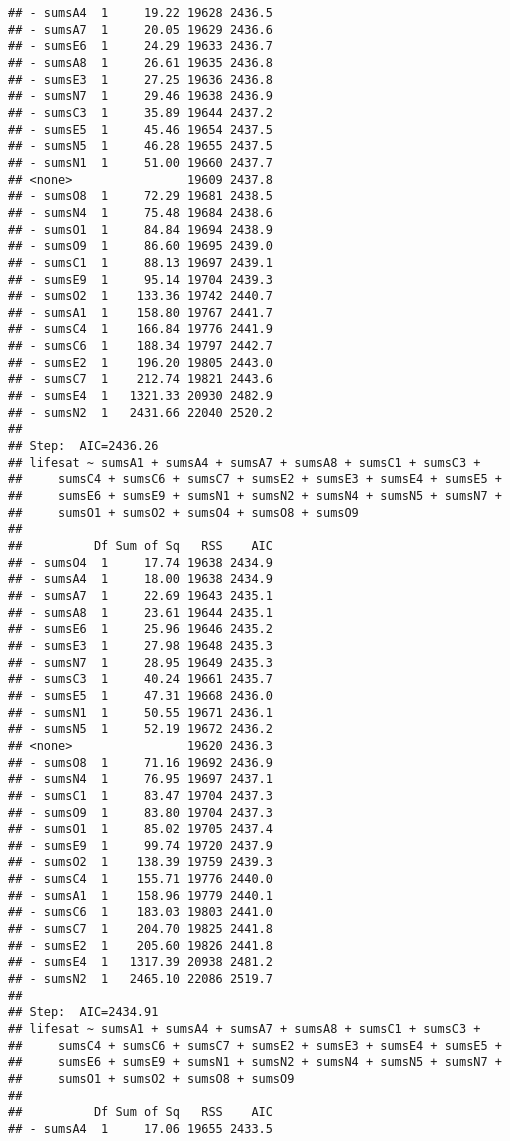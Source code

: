 \documentclass[,man,floatsintext]{apa6}
\begin{document}
\begin{verbatim}
## - sumsA4  1     19.22 19628 2436.5
## - sumsA7  1     20.05 19629 2436.6
## - sumsE6  1     24.29 19633 2436.7
## - sumsA8  1     26.61 19635 2436.8
## - sumsE3  1     27.25 19636 2436.8
## - sumsN7  1     29.46 19638 2436.9
## - sumsC3  1     35.89 19644 2437.2
## - sumsE5  1     45.46 19654 2437.5
## - sumsN5  1     46.28 19655 2437.5
## - sumsN1  1     51.00 19660 2437.7
## <none>                19609 2437.8
## - sumsO8  1     72.29 19681 2438.5
## - sumsN4  1     75.48 19684 2438.6
## - sumsO1  1     84.84 19694 2438.9
## - sumsO9  1     86.60 19695 2439.0
## - sumsC1  1     88.13 19697 2439.1
## - sumsE9  1     95.14 19704 2439.3
## - sumsO2  1    133.36 19742 2440.7
## - sumsA1  1    158.80 19767 2441.7
## - sumsC4  1    166.84 19776 2441.9
## - sumsC6  1    188.34 19797 2442.7
## - sumsE2  1    196.20 19805 2443.0
## - sumsC7  1    212.74 19821 2443.6
## - sumsE4  1   1321.33 20930 2482.9
## - sumsN2  1   2431.66 22040 2520.2
## 
## Step:  AIC=2436.26
## lifesat ~ sumsA1 + sumsA4 + sumsA7 + sumsA8 + sumsC1 + sumsC3 + 
##     sumsC4 + sumsC6 + sumsC7 + sumsE2 + sumsE3 + sumsE4 + sumsE5 + 
##     sumsE6 + sumsE9 + sumsN1 + sumsN2 + sumsN4 + sumsN5 + sumsN7 + 
##     sumsO1 + sumsO2 + sumsO4 + sumsO8 + sumsO9
## 
##          Df Sum of Sq   RSS    AIC
## - sumsO4  1     17.74 19638 2434.9
## - sumsA4  1     18.00 19638 2434.9
## - sumsA7  1     22.69 19643 2435.1
## - sumsA8  1     23.61 19644 2435.1
## - sumsE6  1     25.96 19646 2435.2
## - sumsE3  1     27.98 19648 2435.3
## - sumsN7  1     28.95 19649 2435.3
## - sumsC3  1     40.24 19661 2435.7
## - sumsE5  1     47.31 19668 2436.0
## - sumsN1  1     50.55 19671 2436.1
## - sumsN5  1     52.19 19672 2436.2
## <none>                19620 2436.3
## - sumsO8  1     71.16 19692 2436.9
## - sumsN4  1     76.95 19697 2437.1
## - sumsC1  1     83.47 19704 2437.3
## - sumsO9  1     83.80 19704 2437.3
## - sumsO1  1     85.02 19705 2437.4
## - sumsE9  1     99.74 19720 2437.9
## - sumsO2  1    138.39 19759 2439.3
## - sumsC4  1    155.71 19776 2440.0
## - sumsA1  1    158.96 19779 2440.1
## - sumsC6  1    183.03 19803 2441.0
## - sumsC7  1    204.70 19825 2441.8
## - sumsE2  1    205.60 19826 2441.8
## - sumsE4  1   1317.39 20938 2481.2
## - sumsN2  1   2465.10 22086 2519.7
## 
## Step:  AIC=2434.91
## lifesat ~ sumsA1 + sumsA4 + sumsA7 + sumsA8 + sumsC1 + sumsC3 + 
##     sumsC4 + sumsC6 + sumsC7 + sumsE2 + sumsE3 + sumsE4 + sumsE5 + 
##     sumsE6 + sumsE9 + sumsN1 + sumsN2 + sumsN4 + sumsN5 + sumsN7 + 
##     sumsO1 + sumsO2 + sumsO8 + sumsO9
## 
##          Df Sum of Sq   RSS    AIC
## - sumsA4  1     17.06 19655 2433.5

\end{verbatim}
\end{document}
